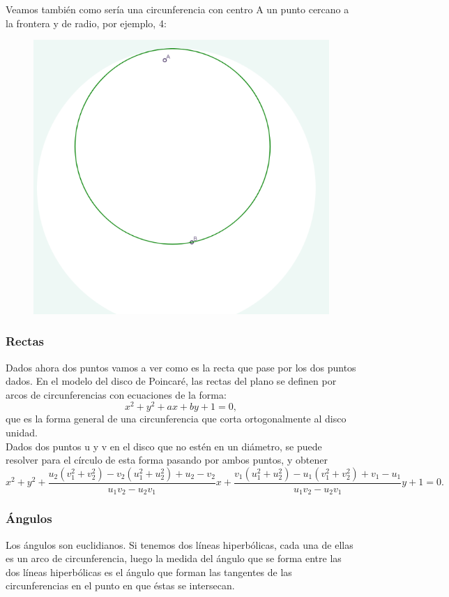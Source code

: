 \documentclass{article}
\theoremstyle{plain}
\theoremstyle{definition}
\theoremstyle{remark}
\begin{document}
Veamos también como sería una circunferencia con centro A un punto
cercano a la frontera y de radio, por ejemplo, 4:

\begin{figure}[h]
\includegraphics{Circunferencia.png}
\end{figure}

\newpage

\subsubsection{Rectas}

Dados ahora dos puntos vamos a ver como es la recta que pase por los
dos puntos dados. En el modelo del disco de Poincaré, las rectas del
plano se definen por arcos de circunferencias con ecuaciones de la
forma: $$x^2+y^2+ax+by+1=0,$$
que es la forma general de una circunferencia que corta ortogonalmente al disco unidad.\\
Dados dos puntos u y v en el disco que no estén en un diámetro, se
puede resolver para el círculo de esta forma pasando por ambos puntos,
y obtener
$$x^{2}+y^{2}+{\frac {u_{2}(v_{1}^{2}+v_{2}^{2})-v_{2}(u_{1}^{2}+u_{2}^{2})+u_{2}-v_{2}}{u_{1}v_{2}-u_{2}v_{1}}}x+{\frac {v_{1}(u_{1}^{2}+u_{2}^{2})-u_{1}(v_{1}^{2}+v_{2}^{2})+v_{1}-u_{1}}{u_{1}v_{2}-u_{2}v_{1}}}y+1=0.$$

\subsubsection{Ángulos}
Los ángulos son euclidianos. Si tenemos dos líneas hiperbólicas, cada
una de ellas es un arco de circunferencia, luego la medida del ángulo
que se forma entre las dos líneas hiperbólicas es el ángulo que forman
las tangentes de las circunferencias en el punto en que éstas se
intersecan.
\end{document}
